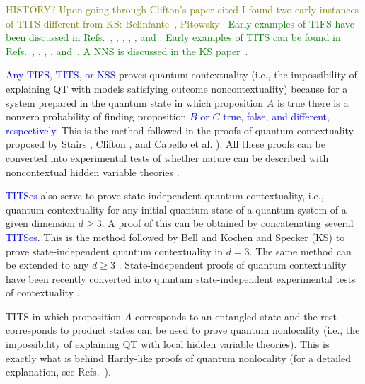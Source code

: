 \documentclass[%
  twocolumn,
 showpacs,
 showkeys,
 preprintnumbers,
 amsmath,amssymb,
 aps,
  pra,
  longbibliography,
 floatfix,
 ]{revtex4-1}
\newcommand{\karl}[1]{\textcolor{blue}{#1}}
\newcommand{\karllate}[1]{\textcolor{green}{#1}}
\newcommand{\meil}[1]{\textcolor{olive}{#1}}
\begin{document}
\meil{HISTORY? Upon going through Clifton's paper cited I
found two early instances of TITS different from KS:
Belinfante~\cite[Fig.~C.l. p.~67]{Belinfante-73}, Pitowsky~\cite[p.~394]{Pitowsky-1982-subs}}
\karllate{
Early examples of TIFS have been discussed in
Refs.~\cite[Fig.~1, p.~182]{kochen2},
\cite[Fig.~B.l. p.~64]{Belinfante-73},
\cite[p.~588-589]{stairs83},
\cite[Sects.~IV, Fig.~2]{clifton-93},
\cite[p.~39, Fig.~2.4.6]{pulmannova-91},
and \cite{Pitowsky2003395,pitowsky-06}.
Early examples of TITS can be found in
Refs.~\cite[$\Gamma_1$, p.~86]{kochen1},
\cite[Fig.~C.l. p.~67]{Belinfante-73},
\cite[p.~394]{Pitowsky-1982-subs},
\cite{clifton-93,Johansen-1994,Vermaas-1994},
and~\cite[Lemma~1]{Cabello-1996-bks-fd}.
A NNS is discussed in the KS paper~\cite[$\Gamma_3$, p.~70]{kochen1}.
}



\karl{Any  TIFS, TITS, or NSS}
proves quantum contextuality (i.e., the impossibility of explaining QT with models satisfying outcome noncontextuality)
because for a system prepared in the quantum state in which proposition $A$ is true
there is a nonzero probability of finding proposition \karl{$B$ or $C$ true, false, and different, respectively.}
This is the method followed in the proofs of quantum contextuality proposed by Stairs \cite{code5}, Clifton \cite{code6}, and Cabello et al. \cite{code7,code7b}). All these proofs can be converted into experimental tests of whether nature can be described with noncontextual hidden variable theories \cite{code8}.

\karl{TITSes} also serve to prove state-independent quantum contextuality, i.e., quantum contextuality for any initial quantum state of a quantum system of a given dimension $d \ge 3$. A proof of this can be obtained by concatenating several \karl{TITSes}. This is the method followed by Bell \cite{code3} and Kochen and Specker (KS) \cite{code4} to prove state-independent quantum contextuality in $d=3$. The same method can be extended to any $d \ge 3$ \cite{code9}. State-independent proofs of quantum contextuality have been recently converted into quantum state-independent experimental tests of contextuality \cite{code10, code11, code12, code13, code14, code14b, code14c}.

TITS in which proposition $A$ corresponds to an entangled state and the rest corresponds to product states can be used to prove quantum nonlocality (i.e., the impossibility of explaining QT with local hidden variable theories). This is exactly what is behind Hardy-like proofs of quantum nonlocality \cite{code14d, code14e} (for a detailed explanation, see Refs.~\cite{code14f, code14g}).
\end{document}
